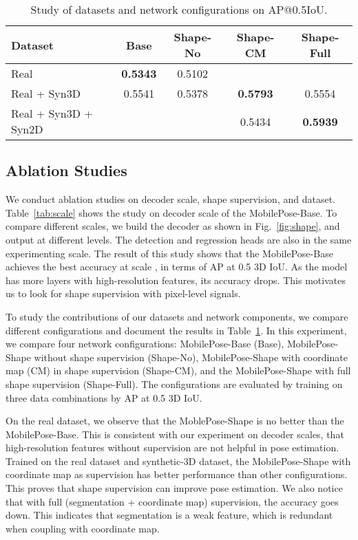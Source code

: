 \documentclass[runningheads]{llncs}
\begin{document}
\begin{table}[t]
\begin{center}
\begin{tabular}{l|@{\hskip 0.3cm}c@{\hskip 0.3cm}|c|c|c}
\hline
Dataset & Base & Shape-No & Shape-CM & Shape-Full\\
\hline
Real & \textbf{0.5343} & 0.5102 & & \\
\hline
Real + Syn3D & 0.5541 & 0.5378 & \textbf{0.5793} & 0.5554 \\
\hline
Real + Syn3D + Syn2D & & & 0.5434 & \textbf{0.5939} \\
\hline
\end{tabular}
\caption{Study of datasets and network configurations on AP@0.5IoU.}
\label{tab:config}
\end{center}
\end{table}

\subsection{Ablation Studies}
We conduct ablation studies on decoder scale, shape supervision, and dataset. Table~\ref{tab:scale} shows the study on decoder scale of the MobilePose-Base. To compare different scales, we build the decoder as shown in Fig.~\ref{fig:shape}, and output at different levels. The detection and regression heads are also in the same experimenting scale. The result of this study shows that the MobilePose-Base achieves the best accuracy at scale , in terms of AP at 0.5 3D IoU. As the model has more layers with high-resolution features, its accuracy drops. This motivates us to look for shape supervision with pixel-level signals.

To study the contributions of our datasets and network components, we compare different configurations and document the results in Table~\ref{tab:config}. In this experiment, we compare four network configurations: MobilePose-Base (Base), MobilePose-Shape without shape supervision (Shape-No), MobilePose-Shape with coordinate map (CM) in shape supervision (Shape-CM), and the MobilePose-Shape with full shape supervision (Shape-Full). The configurations are evaluated by training on three data combinations by AP at 0.5 3D IoU.

On the real dataset, we observe that the MoblePose-Shape is no better than the MobilePose-Base. This is consistent with our experiment on decoder scales, that high-resolution features without supervision are not helpful in pose estimation. Trained on the real dataset and synthetic-3D dataset, the MobilePose-Shape with coordinate map as supervision has better performance than other configurations. This proves that shape supervision can improve pose estimation. We also notice that with full (segmentation + coordinate map) supervision, the accuracy goes down. This indicates that segmentation is a weak feature, which is redundant when coupling with coordinate map.
\end{document}
